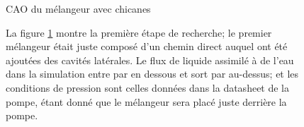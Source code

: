 \documentclass[a4paper, 11pt]{article}
\begin{document}
\newline
\begin{multicols}{2}
    \begin{figure}[H]
        \centering
        \caption{CAO du mélangeur avec chicanes}
        \label{fig:CAO_prototype_melangeur}
    \end{figure}
    \begin{figure}[H]
        La figure \ref{fig:CAO_prototype_melangeur} montre la première étape de recherche;
        le premier mélangeur était juste composé d'un chemin direct auquel ont été ajoutées
        des cavités latérales.
        Le flux de liquide assimilé à de l'eau dans la simulation entre par en dessous et sort par au-dessus;
        et les conditions de pression sont celles données dans la datasheet de la pompe, étant donné
        que le mélangeur sera placé juste derrière la pompe.
    \end{figure}
\end{multicols}
\newpage
\end{document}
